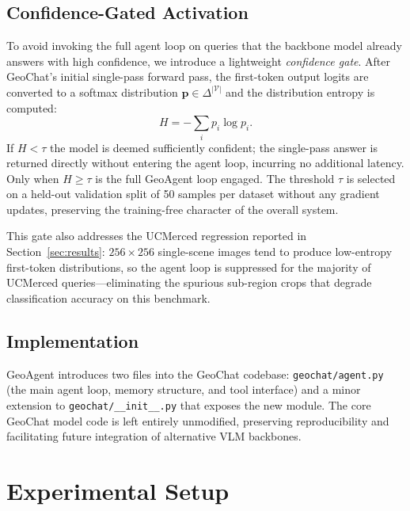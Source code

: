 \documentclass{article}
\begin{document}
\subsection{Confidence-Gated Activation}

To avoid invoking the full agent loop on queries that the backbone model
already answers with high confidence, we introduce a lightweight
\emph{confidence gate}.  After GeoChat's initial single-pass forward pass,
the first-token output logits are converted to a softmax distribution
$\mathbf{p} \in \Delta^{|\mathcal{V}|}$ and the distribution entropy is
computed:
\begin{equation}
  H = -\sum_{i} p_i \log p_i.
\end{equation}
If $H < \tau$ the model is deemed sufficiently confident; the single-pass
answer is returned directly without entering the agent loop, incurring no
additional latency.  Only when $H \geq \tau$ is the full GeoAgent loop
engaged.  The threshold $\tau$ is selected on a held-out validation split
of 50 samples per dataset without any gradient updates, preserving the
training-free character of the overall system.

This gate also addresses the UCMerced regression reported in
Section~\ref{sec:results}: $256\!\times\!256$ single-scene images tend to
produce low-entropy first-token distributions, so the agent loop is
suppressed for the majority of UCMerced queries---eliminating the spurious
sub-region crops that degrade classification accuracy on this benchmark.

\subsection{Implementation}

GeoAgent introduces two files into the GeoChat codebase:
\texttt{geochat/agent.py} (the main agent loop, memory structure, and tool
interface) and a minor extension to \texttt{geochat/\_\_init\_\_.py} that exposes
the new module.  The core GeoChat model code is left entirely unmodified,
preserving reproducibility and facilitating future integration of alternative VLM
backbones.

\section{Experimental Setup}
\label{sec:setup}
\end{document}
